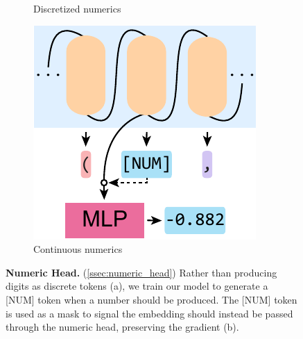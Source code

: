 \begin{figure}[t]
\centering
\begin{subfigure}{0.5\linewidth}
\centering
{}
\caption{Discretized numerics}
\label{fig:not_numeric_head}
\end{subfigure}
\hspace{1cm}
\begin{subfigure}{0.2350\linewidth}
\centering
\vspace{0.1cm}
\includegraphics[width=\linewidth]{figures/diagram/numeric_head_diagram.pdf}
\caption{Continuous numerics}
\label{fig:numeric_head}
\end{subfigure}
\caption{\textbf{Numeric Head.} (\cref{ssec:numeric_head})
Rather than producing digits as discrete tokens (a), we train our model to generate a [NUM] token when a number should be produced.
The [NUM] token is used as a mask to signal the embedding should instead be passed through the numeric head, preserving the gradient (b).
}
\end{figure}